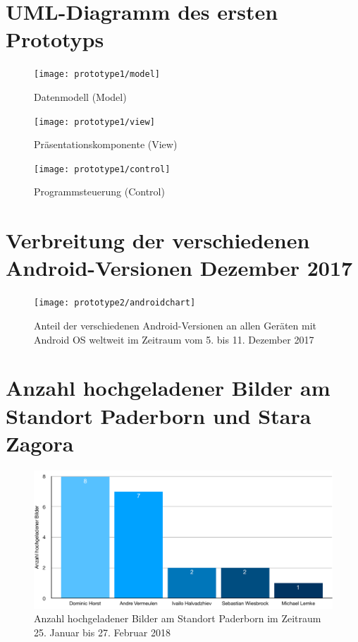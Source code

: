 \chapter{UML-Diagramm des ersten Prototyps}\label{chap:uml}
\begin{figure}[h]
  \centering
  \texttt{[image: prototype1/model]}
  \caption{Datenmodell (Model)}
  \label{fig:model}
\end{figure}

\begin{figure}[h]
  \centering
  \texttt{[image: prototype1/view]}
  \caption{Präsentationskomponente (View)}
  \label{fig:view}
\end{figure}

\begin{figure}[h]
  \centering
  \texttt{[image: prototype1/control]}
  \caption{Programmsteuerung (Control)}
  \label{fig:control}
\end{figure}

\chapter{Verbreitung der verschiedenen Android-Versionen Dezember 2017}
\begin{figure}[h]
  \centering
  \texttt{[image: prototype2/androidchart]}
  \caption{Anteil der verschiedenen Android-Versionen an allen Geräten mit Android OS weltweit im Zeitraum vom 5. bis 11. Dezember 2017}
  \label{fig:versionchart}
\end{figure}

\chapter{Anzahl hochgeladener Bilder am Standort Paderborn und Stara Zagora}
\begin{figure}[h]
  \centering
  \includegraphics[keepaspectratio, width=\textwidth]{data/usage_pb}
  \caption{Anzahl hochgeladener Bilder am Standort Paderborn im Zeitraum 25. Januar bis 27. Februar 2018}
  \label{fig:usagepb}
\end{figure}

